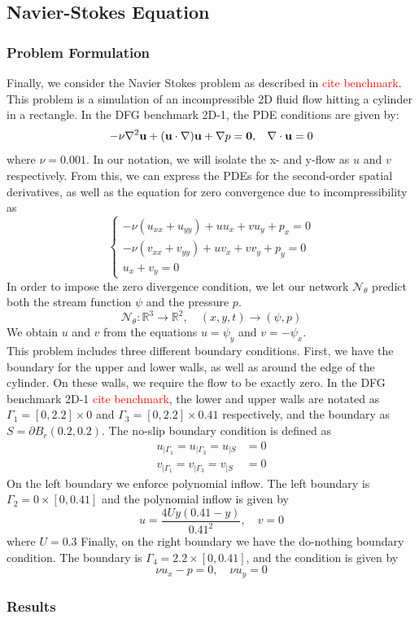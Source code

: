 \subsection{Navier-Stokes Equation}
\subsubsection{Problem Formulation}
Finally, we consider the Navier Stokes problem as described in \textcolor{red}{cite benchmark}. This problem is a simulation of an incompressible 2D fluid flow hitting a cylinder in a rectangle. In the DFG benchmark 2D-1, the PDE conditions are given by:
\begin{equation}
    -\nu \nabla^2 \mathbf{u} + (\mathbf{u} \cdot \nabla)\mathbf{u} + \nabla p = \mathbf{0}, \hspace{3mm} \nabla \cdot \mathbf{u} = 0
\end{equation}
where $\nu = 0.001$. In our notation, we will isolate the x- and y-flow as $u$ and $v$ respectively. From this, we can express the PDEs for the second-order spatial derivatives, as well as the equation for zero convergence due to incompressibility as
\begin{equation}
\begin{cases}
-\nu(u_{xx} + u_{yy})+uu_x+vu_y+p_x = 0 \\
-\nu(v_{xx} + v_{yy})+uv_x+vv_y+p_y = 0 \\
u_x + v_y = 0
\end{cases}
\end{equation}
In order to impose the zero divergence condition, we let our network $\mathcal{N}_\theta$ predict both the stream function $\psi$ and the pressure $p$.
\begin{equation}
    \mathcal{N}_\theta : \mathbb{R}^3 \to \mathbb{R}^2, \quad (x,y,t)\to (\psi, p)
\end{equation}
We obtain $u$ and $v$ from the equations $u=\psi_y$ and $v=-\psi_x$. \\
This problem includes three different boundary conditions. First, we have the boundary for the upper and lower walls, as well as around the edge of the cylinder. On these walls, we require the flow to be exactly zero. In the DFG benchmark 2D-1 \textcolor{red}{cite benchmark}, the lower and upper walls are notated as $\Gamma_1 = [0,2.2]\times 0$ and $\Gamma_3 = [0,2.2]\times 0.41$ respectively, and the boundary as $S=\partial B_r(0.2,0.2)$. The no-slip boundary condition is defined as
\begin{align*}
    u_{|\Gamma_1} = u_{|\Gamma_3} = u_{|S} &= 0 \\
    v_{|\Gamma_1} = v_{|\Gamma_3} = v_{|S} &= 0
\end{align*}
On the left boundary we enforce polynomial inflow. The left boundary is $\Gamma_2 = 0\times [0,0.41]$ and the polynomial inflow is given by
\begin{equation*}
    u=\frac{4Uy(0.41-y)}{0.41^2}, \quad v=0
\end{equation*}
where $U=0.3$
Finally, on the right boundary we have the do-nothing boundary condition. The boundary is $\Gamma_4=2.2\times[0,0.41]$, and the condition is given by
\begin{equation*}
    \nu u_x - p = 0, \quad \nu u_y = 0
\end{equation*}
\subsubsection{Results}